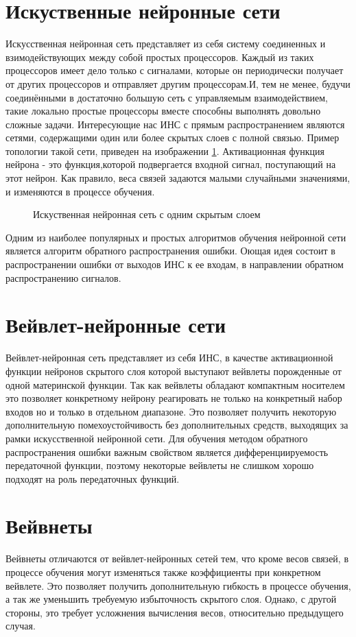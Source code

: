 \documentclass[utf8,usehyperref,14pt]{G7-32}
\begin{document}
\section{Искуственные нейронные сети}
Искусственная нейронная сеть представляет из себя	систему соединенных и взимодействующих между собой простых процессоров. Каждый из таких процессоров имеет дело только с сигналами, которые он периодически получает от других процессоров и отправляет другим процессорам.И, тем не менее, будучи соединёнными в достаточно большую сеть с управляемым взаимодействием, такие локально простые процессоры вместе способны выполнять довольно сложные задачи. Интересующие нас ИНС с прямым распространением являются сетями, содержащими один или более скрытых слоев с полной связью. Пример топологии такой сети, приведен на изображении \ref{ANN}. Активационная функция нейрона - это функция,которой подвергается входной сигнал, поступающий на этот нейрон. Как правило, веса связей задаются малыми случайными значениями, и изменяются в процессе обучения.
\begin{figure}[H]
  \caption{Искуственная нейронная сеть с одним скрытым слоем}\label{ANN}
\end{figure}
Одним из наиболее популярных и простых алгоритмов обучения нейронной сети является алгоритм обратного распространения ошибки. Оющая идея состоит в распространении ошибки от выходов ИНС к ее входам, в направлении обратном распространению сигналов.

\section{Вейвлет-нейронные сети}
Вейвлет-нейронная сеть представляет из себя ИНС, в качестве активационной функции нейронов скрытого слоя которой выступают вейвлеты порожденные от одной материнской функции. Так как вейвлеты обладают компактным носителем это позволяет конкретному нейрону реагировать не  только на конкретный набор входов но и только в отдельном диапазоне. Это позволяет получить некоторую дополнительную помехоустойчивость без дополнительных средств, выходящих за рамки искусственной нейронной сети. Для обучения методом обратного распространения ошибки важным свойством является дифференциируемость передаточной функции, поэтому некоторые вейвлеты не слишком хорошо подходят на роль передаточных функций.

\section{Вейвнеты}
Вейвнеты отличаются от вейвлет-нейронных сетей тем, что кроме весов связей, в процессе обучения могут изменяться также коэффициенты при конкретном вейвлете. Это позволяет получить дополнительную гибкость в процессе обучения, а так же уменьшить требуемую избыточность скрытого слоя. Однако, с другой стороны, это требует усложнения вычисления весов, относительно предыдущего случая.
\end{document}

